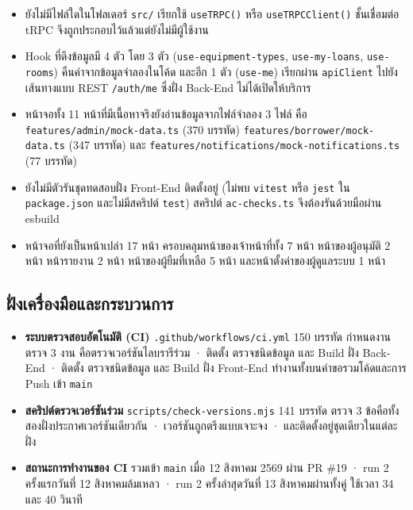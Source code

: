 \begin{itemize}
  \item ยังไม่มีไฟล์ใดในโฟลเดอร์ \texttt{src/} เรียกใช้ \texttt{useTRPC()} หรือ \texttt{useTRPCClient()} ชั้นเชื่อมต่อ tRPC จึงถูกประกอบไว้แล้วแต่ยังไม่มีผู้ใช้งาน
  \item Hook ที่ดึงข้อมูลมี 4 ตัว โดย 3 ตัว (\texttt{use-equipment-types}, \texttt{use-my-loans}, \texttt{use-rooms}) คืนค่าจากข้อมูลจำลองในโค้ด และอีก 1 ตัว (\texttt{use-me}) เรียกผ่าน \texttt{apiClient} ไปยังเส้นทางแบบ REST \texttt{/auth/me} ซึ่งฝั่ง Back-End ไม่ได้เปิดให้บริการ
  \item หน้าจอทั้ง 11 หน้าที่มีเนื้อหาจริงยังอ่านข้อมูลจากไฟล์จำลอง 3 ไฟล์ คือ \texttt{features/admin/mock-data.ts} (370 บรรทัด) \texttt{features/borrower/mock-data.ts} (347 บรรทัด) และ \texttt{features/notifications/mock-notifications.ts} (77 บรรทัด)
  \item ยังไม่มีตัวรันชุดทดสอบฝั่ง Front-End ติดตั้งอยู่ (ไม่พบ \texttt{vitest} หรือ \texttt{jest} ใน \texttt{package.json} และไม่มีสคริปต์ \texttt{test}) สคริปต์ \texttt{ac-checks.ts} จึงต้องรันด้วยมือผ่าน esbuild
  \item หน้าจอที่ยังเป็นหน้าเปล่า 17 หน้า ครอบคลุมหน้าของเจ้าหน้าที่ทั้ง 7 หน้า หน้าของผู้อนุมัติ 2 หน้า หน้ารายงาน 2 หน้า หน้าของผู้ยืมที่เหลือ 5 หน้า และหน้าตั้งค่าของผู้ดูแลระบบ 1 หน้า
\end{itemize}

\subsection{ฝั่งเครื่องมือและกระบวนการ}

\begin{itemize}
  \item \textbf{ระบบตรวจสอบอัตโนมัติ (CI)} \texttt{.github/workflows/ci.yml} 150 บรรทัด กำหนดงานตรวจ 3 งาน คือตรวจเวอร์ชันไลบรารีร่วม · ติดตั้ง ตรวจชนิดข้อมูล และ Build ฝั่ง Back-End · ติดตั้ง ตรวจชนิดข้อมูล และ Build ฝั่ง Front-End ทำงานทั้งบนคำขอรวมโค้ดและการ Push เข้า \texttt{main}
  \item \textbf{สคริปต์ตรวจเวอร์ชันร่วม} \texttt{scripts/check-versions.mjs} 141 บรรทัด ตรวจ 3 ข้อคือทั้งสองฝั่งประกาศเวอร์ชันเดียวกัน · เวอร์ชันถูกตรึงแบบเจาะจง · และติดตั้งอยู่ชุดเดียวในแต่ละฝั่ง
  \item \textbf{สถานะการทำงานของ CI} รวมเข้า \texttt{main} เมื่อ 12 สิงหาคม 2569 ผ่าน PR \#19 · run 2 ครั้งแรกวันที่ 12 สิงหาคมล้มเหลว · run 2 ครั้งล่าสุดวันที่ 13 สิงหาคมผ่านทั้งคู่ ใช้เวลา 34 และ 40 วินาที
\end{itemize}


